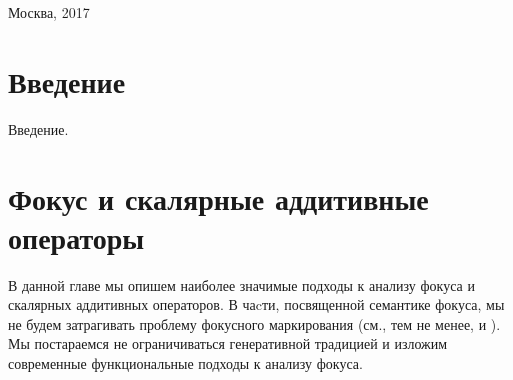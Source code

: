 \documentclass[a4paper, titlepage, 12pt]{article}
\begin{document}
\begin{titlepage}


{\large Москва, 2017} %


 


\end{titlepage}

\thispagestyle{empty} 
\tableofcontents
\thispagestyle{empty}

\clearpage


\section[Введение]{Введение}

Введение.

\setcounter{page}{1}

\section[Фокус и скалярные аддитивные операторы]{Фокус и скалярные аддитивные операторы}

В данной главе мы опишем наиболее значимые подходы к анализу фокуса и скалярных аддитивных операторов. В чаcти, посвященной семантике фокуса, мы не будем затрагивать проблему фокусного маркирования (см., тем не менее, \citep{selkirk1984phonology,selkirk199516} и  \citep{Schwarzschild1999}). Мы постараемся не ограничиваться генеративной традицией и изложим современные функциональные подходы к анализу фокуса.
\end{document}
